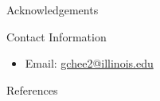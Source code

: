 \documentclass[final]{beamer}
\newlength{\onecolwid}
\newlength{\threecolwid}
\begin{document}
\begin{frame}[t]
\begin{columns}[t,totalwidth=\threecolwid]
\begin{column}{\onecolwid}
\begin{block}{Acknowledgements}
	
\end{block}



\begin{alertblock}{Contact Information}
	\begin{itemize}
		\item Email: \href{mailto:gchee2@illinois.edu}{gchee2@illinois.edu}
	\end{itemize}
	
\end{alertblock}

\begin{block}{References}

	{\footnotesize 
	}
\end{block}





\end{column} %

\end{columns} %

\end{frame} %
\end{document}
